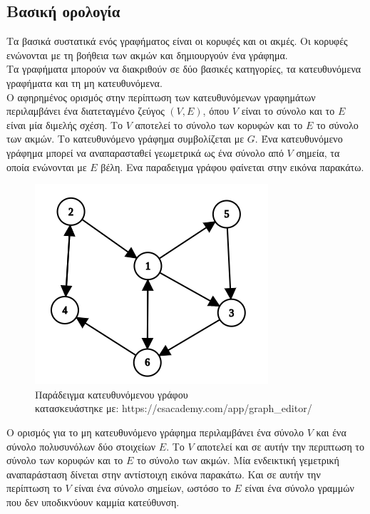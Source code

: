 \documentclass[oneside,12pt]{book}
\newenvironment{matlab}
	{\begin{figure}[hp]\centering\captionsetup{justification=centering}}
	{\end{figure}}
\theoremstyle{definition}
\begin{document}
\subsection{Βασική ορολογία}

Τα βασικά συστατικά ενός γραφήματος είναι  οι κορυφές και οι ακμές. Οι κορυφές ενώνονται με τη βοήθεια των ακμών και δημιουργούν ένα γράφημα. \\

Τα γραφήματα μπορούν να διακριθούν σε δύο βασικές κατηγορίες, τα κατευθυνόμενα γραφήματα και τη μη κατευθυνόμενα. \\

Ο αφηρημένος ορισμός στην περίπτωση των κατευθυνόμενων γραφημάτων περιλαμβάνει ένα διατεταγμένο ζεύγος \((V,E)\), όπου \(V\) είναι το σύνολο και το \(E\) είναι μία διμελής σχέση. Το \(V\) αποτελεί το σύνολο των κορυφών και το \(E\) το σύνολο των ακμών. Το κατευθυνόμενο γράφημα συμβολίζεται με \(G\). Ένα κατευθυνόμενο γράφημα μπορεί να αναπαρασταθεί γεωμετρικά ως ένα σύνολο από \(V\) σημεία, τα οποία ενώνονται με \(E\) βέλη. Ενα παραδειγμα γράφου φαίνεται στην εικόνα παρακάτω.

\begin{matlab}
	\includegraphics[scale=0.8]{images/directed_graph_example.png}
	\caption{Παράδειγμα κατευθυνόμενου γράφου \\ κατασκευάστηκε με: https://csacademy.com/app/graph\_editor/}
\end{matlab} 

Ο ορισμός για το μη κατευθυνόμενο γράφημα περιλαμβάνει ένα σύνολο \(V\) και ένα σύνολο πολυσυνόλων δύο στοιχείων \(E\). Το \(V\) αποτελεί και σε αυτήν την περιπτωση το σύνολο των κορυφών και το \(E\) το σύνολο των ακμών. Μία ενδεικτική γεμετρική αναπαράσταση δίνεται στην αντίστοιχη εικόνα παρακάτω. Και σε αυτήν την περίπτωση το \(V\) είναι ένα σύνολο σημείων, ωστόσο το \(E\) είναι ένα σύνολο γραμμών που δεν υποδικνύουν καμμία κατεύθυνση. \\
\end{document}
